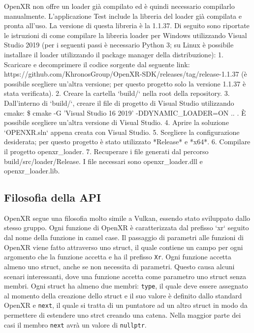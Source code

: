 \documentclass[twoside]{supsistudent}
\begin{document}
OpenXR non offre un loader già compilato ed è quindi necessario compilarlo manualmente. L'applicazione Test include la libreria del loader già compilata e pronta all'uso. La versione di questa libreria è la 1.1.37. Di seguito sono riportate le istruzioni di come compilare la libreria loader per Windows utilizzando Visual Studio 2019 (per i seguenti passi è necessario Python 3; su Linux è possibile installare il loader utilizzando il package manager della distribuzione):
1. Scaricare e decomprimere il codice sorgente dal seguente link: https://github.com/KhronosGroup/OpenXR-SDK/releases/tag/release-1.1.37 (è possibile scegliere un'altra versione; per questo progetto solo la versione 1.1.37 è stata verificata).
2. Creare la cartella `build/` nella root della repository.
3. Dall'interno di `build/`, creare il file di progetto di Visual Studio utilizzando cmake: \$ cmake -G 'Visual Studio 16 2019' -DDYNAMIC\_LOADER=ON .. . È possibile scegliere un'altra versione di Visual Studio.
4. Aprire la soluzione `OPENXR.sln` appena creata con Visual Studio.
5. Scegliere la configurazione desiderata; per questo progetto è stato utilizzato *Release* e *x64*.
6. Compilare il progetto openxr\_loader.
7. Recuperare i file generati dal percorso build/src/loader/Release. I file necessari sono openxr\_loader.dll e openxr\_loader.lib.

\subsection{Filosofia della API}

OpenXR segue una filosofia molto simile a Vulkan, essendo stato sviluppato dallo stesso gruppo. Ogni funzione di OpenXR è caratterizzata dal prefisso `xr` seguito dal nome della funzione in camel case. Il passaggio di parametri alle funzioni di OpenXR viene fatto attraverso uno struct, il quale contiene un campo per ogni argomento che la funzione accetta e ha il prefisso \texttt{Xr}. Ogni funzione accetta almeno uno struct, anche se non necessita di parametri. Questo causa alcuni scenari interessanti, dove una funzione accetta come parametro uno struct senza membri. Ogni struct ha almeno due membri: \texttt{type}, il quale deve essere assegnato al momento della creazione dello struct e il suo valore è definito dallo standard OpenXR e \texttt{next}, il quale si tratta di un puntatore ad un altro struct in modo da permettere di estendere uno strct creando una catena. Nella maggior parte dei casi il membro \texttt{next} avrà un valore di \texttt{nullptr}.
\end{document}
